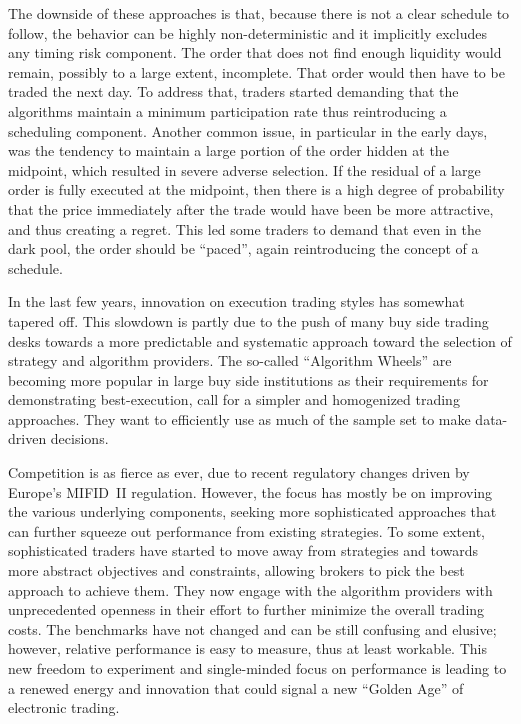 The downside of these approaches is that, because there is not a clear schedule to follow, the behavior can be highly non-deterministic and it implicitly excludes any timing risk component. The order that does not find enough liquidity would remain, possibly to a large extent, incomplete. That order would then have to be traded the next day. To address that, traders started demanding that the algorithms maintain a minimum participation rate thus reintroducing a scheduling component. Another common issue, in particular in the early days, was the tendency to maintain a large portion of the order hidden at the midpoint, which resulted in severe adverse selection. If the residual of a large order is fully executed at the midpoint, then there is a high degree of probability that the price immediately after the trade would have been be more attractive, and thus creating a regret. This led some traders to demand that even in the dark pool, the order should be ``paced'', again reintroducing the concept of a schedule.


In the last few years, innovation on execution trading styles has somewhat tapered off. This slowdown is partly due to the push of many buy side trading desks towards a more predictable and systematic approach toward the selection of strategy and algorithm providers. The so-called ``Algorithm Wheels'' are becoming more popular in large buy side institutions as their requirements for demonstrating best-execution, call for a simpler and homogenized trading approaches. They want to efficiently use as much of the sample set to make data-driven decisions. 


Competition is as fierce as ever, due to recent regulatory changes driven by Europe's MIFID~II regulation. However, the focus has mostly be on improving the various underlying components, seeking more sophisticated approaches that can further squeeze out performance from existing strategies. To some extent, sophisticated traders have started to move away from strategies and towards more abstract objectives and constraints, allowing brokers to pick the best approach to achieve them. They now engage with the algorithm providers with unprecedented openness in their effort to further minimize the overall trading costs. The benchmarks have not changed and can be still confusing and elusive; however, relative performance is easy to measure, thus at least workable. This new freedom to experiment and single-minded focus on performance is leading to a renewed energy and innovation that could signal a new ``Golden Age'' of electronic trading.



